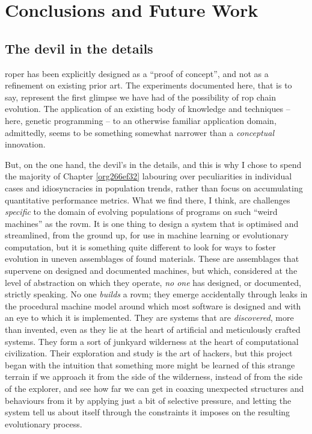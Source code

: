 \documentclass[12pt,glossary]{dalthesis}
\begin{document}
\chapter{Conclusions and Future Work}
\label{sec:org7a75f60}
\label{org834aca2}

\section{The devil in the details}
\label{sec:org92ea81e}

\Gls{roper} has been explicitly designed as a ``proof of concept'', and not
as a refinement on existing prior art. The experiments documented here,
that is to say, represent the first glimpse we have had of the possibility
of \gls{rop} chain evolution. The application of an existing body of knowledge
and techniques -- here, genetic programming -- to an otherwise familiar
application domain, admittedly, seems to be something somewhat narrower than
a \emph{conceptual} innovation. 

But, on the one hand, the devil's in the details, and this is why I chose to
spend the majority of Chapter \ref{org266ef32} labouring over peculiarities
in individual cases and idiosyncracies in population trends, rather than focus
on accumulating quantitative performance metrics. What we find there, I think,
are challenges \emph{specific} to the domain of evolving populations of programs on
such ``weird machines'' as the \gls{rovm}. It is one thing to design a system that
is optimised and streamlined, from the ground up, for use in machine learning
or evolutionary computation, but it is something quite different to look for
ways to foster evolution in uneven assemblages of found materials. These are
assemblages that supervene on designed and documented machines, but which,
considered at the level of abstraction on which they operate, \emph{no one} has
designed, or documented, strictly speaking. No one \emph{builds} a \gls{rovm}; they
emerge accidentally through leaks in the procedural machine model around which
most software is designed and with an eye to which it is implemented. They
are systems that are \emph{discovered}, more than invented, even as they lie at
the heart of artificial and meticulously crafted systems. They form a sort
of junkyard wilderness at the heart of computational civilization. Their
exploration and study is the art of hackers, but this project began with the
intuition that something more might be learned of this strange terrain if
we approach it from the side of the wilderness, instead of from the side of
the explorer, and see how far we can get in coaxing unexpected structures 
and behaviours from it by applying just a bit of selective pressure, and
letting the system tell us about itself through the constraints it imposes 
on the resulting evolutionary process. 
\end{document}

